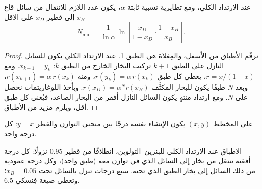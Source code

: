 \begin{proposition}[فِنسكي]\label{prop:b2:liquid-vapour-diagrams:fenske}
عند الارتداد الكلي، ومع تطايرية نسبية ثابتة $\alpha$، يكون عدد
 اللازم للانتقال من سائل قاع $x_B$ إلى قطير
$x_D$ على الأقل
\[
  N_{\min} = \frac{1}{\ln\alpha}\,\ln\!\left[\frac{x_D}{1 - x_D}\cdot\frac{1 - x_B}{x_B}\right] .
\]
\end{proposition}

\begin{proof}
نرقّم الأطباق من الأسفل، والمِغلاة هي الطبق 1. عند الارتداد الكلي
يكون للسائل النازل على الطبق $k + 1$ تركيب البخار
الخارج من الطبق $k$: $x_{k+1} = y_k$. ومع $r = x/(1 - x)$، يعطي كل طبق
$r(y_k) = \alpha\,r(x_k)$، ومنه $r(x_{k+1}) = \alpha\,r(x_k)$، وبعد $N$
طبقًا يكون للبخار المكثَّف $r(x_D) = \alpha^N r(x_B)$. وبأخذ اللوغاريتمات
نحصل على $N$. ومع ارتداد منتهٍ يكون السائل النازل أفقر من
البخار الصاعد، فيُغني كل طبق أقل، ويلزم مزيد من الأطباق.
\end{proof}

على المخطط $(x, y)$ يكون الإنشاء نفسه درجًا بين
منحنى التوازن والقطر $y = x$: كل درجة 
واحد.

\begin{omfigure}

{\small الأطباق عند الارتداد الكلي للبنزين--التولوين، انطلاقًا من قطير
0.95 نزولًا: كل درجة أفقية تنتقل من بخار إلى السائل الذي في
توازن معه (طبق واحد)، وكل درجة عمودية من ذلك السائل إلى
بخار الطبق الذي تحته. سبع درجات تنزل بالسائل تحت $x_B = 0.05$؛
وتعطي صيغة فِنسكي 6.5.}
\end{omfigure}

